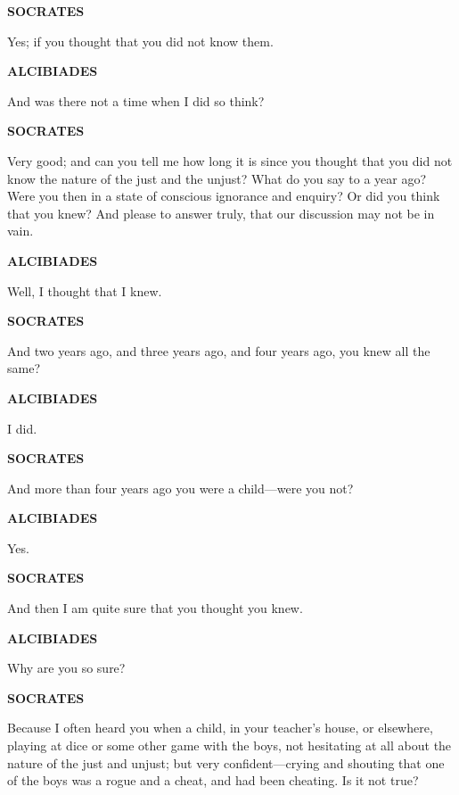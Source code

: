 \documentclass[11pt,letter]{article}
\begin{document}
\par \textbf{SOCRATES}
\par   Yes; if you thought that you did not know them.

\par \textbf{ALCIBIADES}
\par   And was there not a time when I did so think?

\par \textbf{SOCRATES}
\par   Very good; and can you tell me how long it is since you thought that you did not know the nature of the just and the unjust? What do you say to a year ago? Were you then in a state of conscious ignorance and enquiry? Or did you think that you knew? And please to answer truly, that our discussion may not be in vain.

\par \textbf{ALCIBIADES}
\par   Well, I thought that I knew.

\par \textbf{SOCRATES}
\par   And two years ago, and three years ago, and four years ago, you knew all the same?

\par \textbf{ALCIBIADES}
\par   I did.

\par \textbf{SOCRATES}
\par   And more than four years ago you were a child—were you not?

\par \textbf{ALCIBIADES}
\par   Yes.

\par \textbf{SOCRATES}
\par   And then I am quite sure that you thought you knew.

\par \textbf{ALCIBIADES}
\par   Why are you so sure?

\par \textbf{SOCRATES}
\par   Because I often heard you when a child, in your teacher's house, or elsewhere, playing at dice or some other game with the boys, not hesitating at all about the nature of the just and unjust; but very confident—crying and shouting that one of the boys was a rogue and a cheat, and had been cheating. Is it not true?
\end{document}
